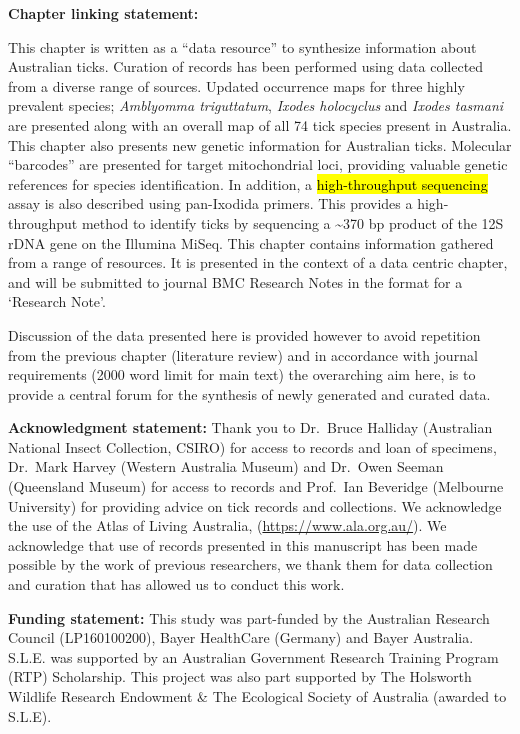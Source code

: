 \documentclass[a4paper, nobind]{templates/ociamthesis}
\begin{document}
\newpage

\textbf{Chapter linking statement:}

This chapter is written as a ``data resource'' to synthesize information about Australian ticks.
Curation of records has been performed using data collected from a diverse range of sources.
Updated occurrence maps for three highly prevalent species; \emph{Amblyomma triguttatum}, \emph{Ixodes holocyclus} and \emph{Ixodes tasmani} are presented along with an overall map of all 74 tick species present in Australia. This chapter also presents new genetic information for Australian ticks.
Molecular ``barcodes'' are presented for target mitochondrial loci, providing valuable genetic references for species identification. In addition, a \hl{high-throughput sequencing} assay is also described using pan-Ixodida primers.
This provides a high-throughput method to identify ticks by sequencing a \textasciitilde370 bp product of the 12S rDNA gene on the Illumina MiSeq.
This chapter contains information gathered from a range of resources.
It is presented in the context of a data centric chapter, and will be submitted to journal BMC Research Notes in the format for a `Research Note'.

Discussion of the data presented here is provided however to avoid repetition from the previous chapter (literature review) and in accordance with journal requirements (2000 word limit for main text) the overarching aim here, is to provide a central forum for the synthesis of newly generated and curated data.

\vspace{5mm}

\textbf{Acknowledgment statement:}
Thank you to Dr.~Bruce Halliday (Australian National Insect Collection, CSIRO) for access to records and loan of specimens, Dr.~Mark Harvey (Western Australia Museum) and Dr.~Owen Seeman (Queensland Museum) for access to records and Prof.~Ian Beveridge (Melbourne University) for providing advice on tick records and collections.
We acknowledge the use of the Atlas of Living Australia, (\url{https://www.ala.org.au/}).
We acknowledge that use of records presented in this manuscript has been made possible by the work of previous researchers, we thank them for data collection and curation that has allowed us to conduct this work.

\vspace{5mm}

\textbf{Funding statement:}
This study was part-funded by the Australian Research Council (LP160100200), Bayer HealthCare (Germany) and Bayer Australia.
S.L.E. was supported by an Australian Government Research Training Program (RTP) Scholarship.
This project was also part supported by The Holsworth Wildlife Research Endowment \& The Ecological Society of Australia (awarded to S.L.E).
\end{document}
